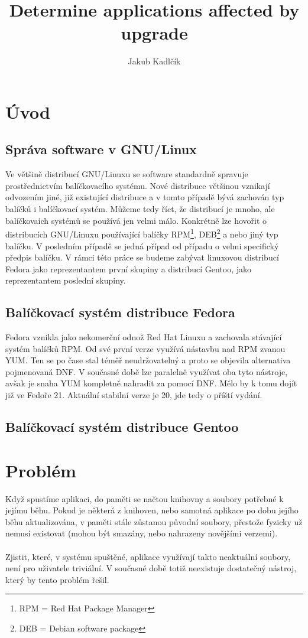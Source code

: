 \documentclass[10pt,a4paper]{article}
\title{Determine applications affected by upgrade}
\author{Jakub Kadlčík}
\begin{document}
	\maketitle
	\newpage
	
	
	
	\tableofcontents
	\newpage
	
	\section{Úvod}
		\subsection{Správa software v GNU/Linux}
		Ve většině distribucí GNU/Linuxu se software standardně spravuje prostřednictvím balíčkovacího systému. Nové distribuce většinou vznikají odvozením jiné, již existující distribuce a v tomto případě bývá zachován typ balíčků i balíčkovací systém. Můžeme tedy říct, že distribucí je mnoho, ale balíčkovaích systémů se používá jen velmi málo. Konkrétně lze hovořit o distribucích GNU/Linuxu používající balíčky RPM\footnote{RPM = Red Hat Package Manager}, DEB\footnote{DEB = Debian software package} a nebo jiný typ balíčku. V posledním případě se jedná případ od případu o velmi specifický předpis balíčku. V rámci této práce se budeme zabývat linuxovou distribucí Fedora jako reprezentantem první skupiny a distribucí Gentoo, jako reprezentantem poslední skupiny.
		
		\subsection{Balíčkovací systém distribuce Fedora}
		Fedora vznikla jako nekomerční odnož Red Hat Linuxu a zachovala stávající systém balíčků RPM. Od své první verze využívá nástavbu nad RPM zvanou YUM. Ten se po čase stal téměř neudržovatelný a proto se objevila alternativa pojmenovaná DNF. V současné době lze paralelně využívat oba tyto nástroje, avšak je snaha YUM kompletně nahradit za pomocí DNF. Mělo by k tomu dojít již ve Fedoře 21. Aktuální stabilní verze je 20, jde tedy o příští vydání.
				
		\subsection{Balíčkovací systém distribuce Gentoo}

	\section{Problém}
	Když spustíme aplikaci, do paměti se načtou knihovny a soubory potřebné k jejímu běhu. Pokud je některá z knihoven, nebo samotná aplikace po dobu jejího běhu aktualizována, v paměti stále zůstanou původní soubory, přestože fyzicky už nemusí existovat (mohou být smazány, nebo nahrazeny novějšími verzemi).
	\\\\
	Zjistit, které, v systému spuštěné, aplikace využívají takto neaktuální soubory, není pro uživatele triviální. V současné době totiž neexistuje dostatečný nástroj, který by tento problém řešil.
	
\end{document}
